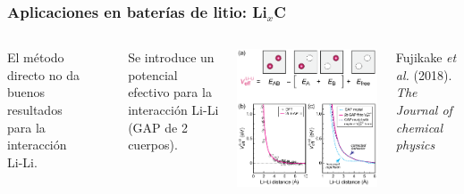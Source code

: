 \documentclass[aspectratio=169]{beamer}
\begin{document}
    \begin{frame}
        \frametitle{Aplicaciones en baterías de litio: Li$_x$C}
        
        \begin{columns}
            El método directo no da buenos resultados para la interacción Li-Li.


            \ \pause 

            Se introduce un potencial efectivo para la interacción Li-Li (GAP de 
            2 cuerpos).

            \begin{center}
                \includegraphics[width=\columnwidth]{LiC-LiLi_efectivo.png}
            \end{center}
            \tiny{Fujikake \textit{et al.} (2018). \textit{The Journal of chemical
            physics}}
        \end{columns}

    \end{frame}
\end{document}
